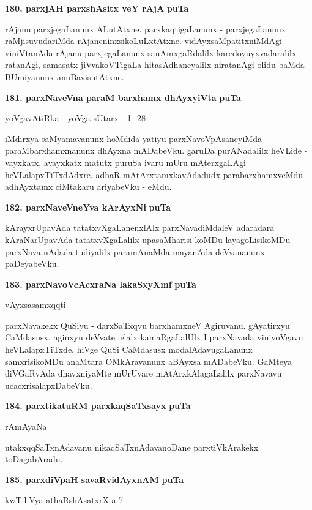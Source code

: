 \medskip
\noindent
\textbf{180. parxjAH parxshAsitx veY rAjA} \hfill{\bf puTa }

\smallskip
rAjanu parxjegaLanunx ALutAtxne. parxkaqtigaLanunx - parxjegaLanunx raMjisuvudariMda rAjaneninxsikoLuLxtAtxne. vidAyxsaMpatitxniMdAgi viniVtanAda rAjanu parxjegaLanunx sanAmxgaRdalilx karedoyuyxvadaralilx ratanAgi, samasatx jiVvakoVTigaLa hitasAdhaneyalilx niratanAgi olidu baMda BUmiyanunx anuBavisutAtxne.

\eject

\noindent
\textbf{181. parxNaveVna paraM barxhamx dhAyxyiVta} \hfill{\bf puTa }

\hfill{yoVgavAtiRka - yoVga sUtarx - 1- 28}

\smallskip
iMdirxya saMyamavanunx hoMdida yatiyu parxNavoVpAsaneyiMda paraMbarxhamxnanunx dhAyxna mADabeVku. garuDa purANadalilx heVLide - vayxkatx, avayxkatx matutx puruSa ivaru mUru mAterxgaLAgi heVLalapxTiTxdAdxre. adhaR mAtArxtamxkavAdadudx parabarxhamxveMdu adhAyxtamx ciMtakaru ariyabeVku - eMdu.


\medskip
\noindent
\textbf{182. parxNaveVneYva kArAyxNi} \hfill{\bf puTa }

\smallskip
kArayxrUpavAda tatatxvXgaLanenxlAlx parxNavadiMdaleV adaradara kAraNarUpavAda tatatxvXgaLalilx upasaMharisi koMDu-layagoLisikoMDu parxNava nAdada tudiyalilx paramAnaMda mayanAda deVvananunx paDeyabeVku.

\medskip
\noindent
\textbf{183. parxNavoVcAcxraNa lakaSxyXmf} \hfill{\bf puTa }

\hfill{vAyxsasamxqqti}

\smallskip
parxNavakekx QuSiyu - darxSaTxqvu barxhamxneV Agiruvanu. gAyatirxyu CaMdasusx. aginxyu deVvate. elalx kamaRgaLalUlx I parxNavada viniyoVgavu heVLalapxTiTxde. hiVge QuSi CaMdasusx modalAdavugaLanunx samxrisikoMDu anaMtara OMkAravanunx aBAyxsa mADabeVku. GaMteya diVGaRvAda dhavxniyaMte mUrUvare mAtArxkAlagaLalilx parxNavavu ucacxrisalapxDabeVku.

\medskip
\noindent
\textbf{184. parxtikatuRM parxkaqSaTxsayx} \hfill{\bf puTa }

\hfill{rAmAyaNa}

\smallskip
utakxqqSaTxnAdavanu nikaqSaTxnAdavanoDane parxtiVkArakekx toDagabAradu.

\medskip
\noindent
\textbf{185. parxdiVpaH savaRvidAyxnAM} \hfill{\bf puTa }

\hfill{kwTiliVya athaRshAsatxrX a-7}

